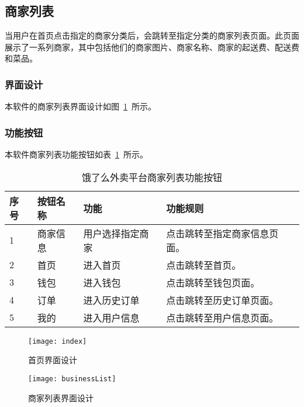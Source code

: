 \subsection{商家列表}
当用户在首页点击指定的商家分类后，会跳转至指定分类的商家列表页面。此页面展示了一系列商家，其中包括他们的商家图片、商家名称、商家的起送费、配送费和菜品。
\subsubsection{界面设计}
本软件的商家列表界面设计如图~\ref{fig:businessList}~所示。
\subsubsection{功能按钮}
本软件商家列表功能按钮如表~\ref{tab:table3}~所示。
\begin{table}[htbp]
    \caption{饿了么外卖平台商家列表功能按钮}\label{tab:table3}
    \vspace{0.5em}\wuhao
    \begin{tabularx}{\textwidth}{lllX}
    \toprule[1.5pt]
    序号 & 按钮名称 & 功能 & 功能规则 \\ 
    \midrule[1pt]
    1 & 商家信息 & 用户选择指定商家 & 点击跳转至指定商家信息页面。 \\
    2 & 首页 & 进入首页 & 点击跳转至首页。 \\
    3 & 钱包 & 进入钱包 & 点击跳转至钱包页面。 \\
    4 & 订单 & 进入历史订单 & 点击跳转至历史订单页面。 \\
    5 & 我的 & 进入用户信息 & 点击跳转至用户信息页面。 \\
\bottomrule[1.5pt]
\end{tabularx}
\vspace{\baselineskip}
\end{table}
\begin{figure}[htbp]
    \centering
    \begin{minipage}{0.4\textwidth}
    \centering
    \texttt{[image: index]}
    \caption{首页界面设计}\label{fig:index}
    \end{minipage}
    \begin{minipage}{0.4\textwidth}
    \centering
    \texttt{[image: businessList]}
    \caption{商家列表界面设计}\label{fig:businessList}
    \end{minipage}
    \vspace{\baselineskip}
\end{figure}

